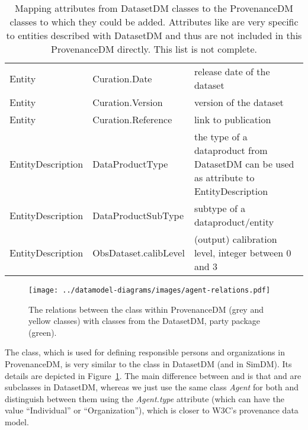 \begin{table}[h]
\small
{}\textwidth
\begin{tabulary}{1.0\textwidth}{@{}Llp{5cm}@{}}
\toprule
{} &  & \\
\midrule
Entity           & Curation.Date          & release date of the dataset\\
Entity           & Curation.Version       & version of the dataset\\
Entity           & Curation.Reference     & link to publication\\
EntityDescription & DataProductType & the type of a dataproduct from DatasetDM can be used as attribute to EntityDescription\\
EntityDescription & DataProductSubType    & subtype of a \mbox{dataproduct}/entity\\
EntityDescription & ObsDataset.calibLevel & (output) calibration level, integer between 0 and 3\\
\bottomrule
\end{tabulary}
\caption[Mapping attributes from DatasetDM classes to the ProvenanceDM classes]{Mapping attributes from DatasetDM classes to the ProvenanceDM classes to which they could be added. Attributes like  are very specific to entities described with DatasetDM and thus are not included in this ProvenanceDM directly. This list is not complete.}
\label{tab:datasetmapping2}
\end{table}


\begin{figure}[h]
\centering
\texttt{[image: ../datamodel-diagrams/images/agent-relations.pdf]}
\caption[Agent in ProvenanceDM and Party in DatasetDM]{The relations between the  class within ProvenanceDM 
(grey and yellow classes) with classes from the DatasetDM, party package (green).}
\label{fig:agent-relations}
\end{figure}

The  class, which is used for defining responsible persons and 
organizations in ProvenanceDM, is very similar to the  class in DatasetDM (and in SimDM). Its details are depicted in Figure~\ref{fig:agent-relations}.
The main difference between  and  is that  and  are subclasses in DatasetDM, whereas we just use the same class \emph{Agent} for both and distinguish between them using the \emph{Agent.type} attribute (which can have the value ``Individual'' or ``Organization''), which is closer to W3C's provenance data model.


